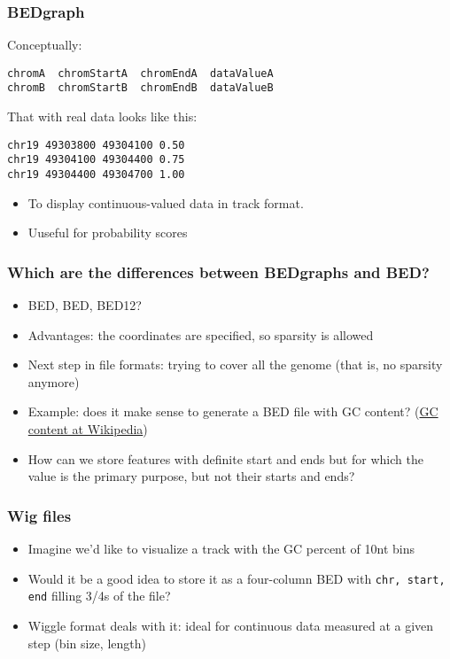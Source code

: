 \documentclass{beamer}
\begin{document}
\begin{frame}[fragile]
\frametitle{BEDgraph}

Conceptually:

\begin{verbatim}
chromA  chromStartA  chromEndA  dataValueA
chromB  chromStartB  chromEndB  dataValueB
\end{verbatim}

That with real data looks like this:

\begin{verbatim}
chr19 49303800 49304100 0.50
chr19 49304100 49304400 0.75
chr19 49304400 49304700 1.00
\end{verbatim}
\begin{itemize}
    \item To display continuous-valued data in track format.
    \item Uuseful for probability scores
    \end{itemize}
\end{frame}

\begin{frame}
  \frametitle{Which are the differences between BEDgraphs and BED?}
  \begin{itemize}
  \item BED, BED, BED12?
  \item Advantages: the coordinates are specified, so sparsity is allowed
  \item Next step in file formats: trying to cover all the genome (that is, no sparsity anymore)
  \item Example: does it make sense to generate a BED file with GC content? (\href{https://en.wikipedia.org/wiki/GC-content}{GC content at Wikipedia})
  \item How can we store features with definite start and ends but for which the value is the primary purpose, but not their starts and ends?
  \end{itemize}
\end{frame}





\begin{frame}
  \frametitle{Wig files}
  \begin{itemize}
  \item Imagine we'd like to visualize a track with the GC percent of 10nt bins
  \item Would it be a good idea to store it as a four-column BED with \texttt{chr, start, end} filling 3/4s of the file?
  \item Wiggle format deals with it: ideal for continuous data measured at a given step (bin size, length)
  \end{itemize}
\end{frame}
\end{document}
